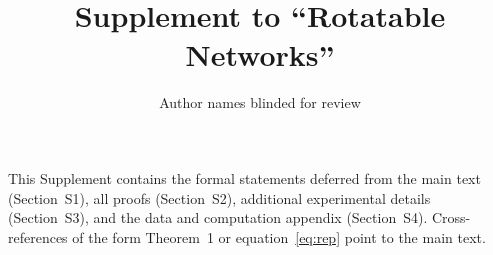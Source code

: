 \documentclass[12pt]{article}
\title{\bfseries Supplement to ``Rotatable Networks''}
\author{Author names blinded for review}
\date{}
\theoremstyle{definition}
\theoremstyle{remark}
\begin{document}
\maketitle

This Supplement contains the formal statements deferred from the main
text (Section~S1), all proofs (Section~S2), additional experimental
details (Section~S3), and the data and computation appendix
(Section~S4). Cross-references of the form Theorem~1 or
equation~\eqref{eq:rep} point to the main text.








\end{document}
